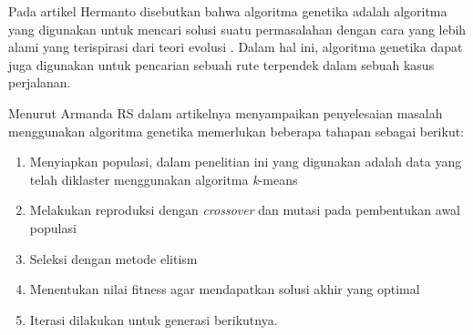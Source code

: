Pada artikel Hermanto disebutkan bahwa algoritma genetika adalah algoritma yang digunakan untuk mencari solusi suatu permasalahan dengan cara yang lebih alami yang terispirasi dari teori evolusi  \cite{hermawanto2003algoritma}. Dalam hal ini, algoritma genetika dapat juga digunakan untuk pencarian sebuah rute terpendek dalam sebuah kasus perjalanan.

Menurut Armanda RS \cite{armanda2016penerapan} dalam artikelnya menyampaikan penyelesaian masalah menggunakan algoritma genetika memerlukan beberapa tahapan sebagai berikut:

\begin{enumerate}
	\item Menyiapkan populasi, dalam penelitian ini yang digunakan adalah data yang telah diklaster menggunakan algoritma \textit{k}-means
	\item Melakukan reproduksi dengan \textit{crossover} dan mutasi pada pembentukan awal populasi
	\item Seleksi dengan metode elitism
	\item Menentukan nilai fitness agar mendapatkan solusi akhir yang optimal
	\item Iterasi dilakukan untuk generasi berikutnya.
\end{enumerate}